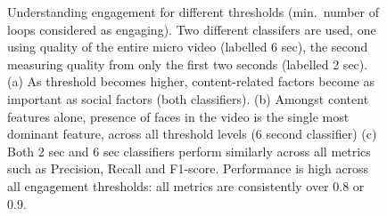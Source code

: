 \begin{figure}[!htbp]
\centering
\hspace*{-5mm}
\caption{ Understanding engagement for different thresholds (min.\ number of loops considered as engaging). Two different classifers are used, one using quality of the entire micro video (labelled 6 sec), the second measuring quality from only the first two seconds (labelled 2 sec). (a) As threshold becomes higher, content-related factors become as important as social factors (both classifiers).  (b) Amongst content features alone, presence of faces in the video is the single most dominant feature, across all threshold levels (6 second classifier) (c) Both 2 sec and 6 sec classifiers perform similarly across all metrics such as Precision, Recall and F1-score. Performance is high across all engagement thresholds: all metrics are consistently over 0.8 or 0.9.}
\label{fig:classifier}
\end{figure}



